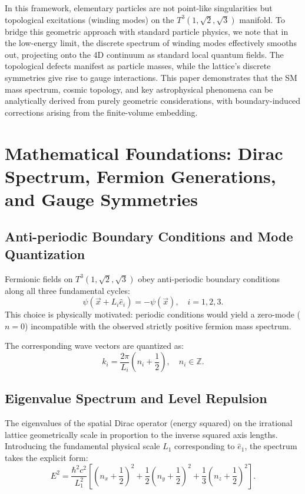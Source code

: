 \documentclass[onecolumn,aps,prd,superscriptaddress,nofootinbib,amsmath,amssymb]{revtex4-2}
\theoremstyle{definition}
\theoremstyle{remark}
\newcommand{\Tthree}{T^3(1,\sqrt{2},\sqrt{3})}
\begin{document}
In this framework, elementary particles are not point-like singularities but topological excitations (winding modes) on the $\Tthree$ manifold. To bridge this geometric approach with standard particle physics, we note that in the low-energy limit, the discrete spectrum of winding modes effectively smooths out, projecting onto the 4D continuum as standard local quantum fields. The topological defects manifest as particle masses, while the lattice's discrete symmetries give rise to gauge interactions. This paper demonstrates that the SM mass spectrum, cosmic topology, and key astrophysical phenomena can be analytically derived from purely geometric considerations, with boundary-induced corrections arising from the finite-volume embedding.

\section{Mathematical Foundations: Dirac Spectrum, Fermion Generations, and Gauge Symmetries}
\label{sec:dirac}

\subsection{Anti-periodic Boundary Conditions and Mode Quantization}

Fermionic fields on $\Tthree$ obey anti-periodic boundary conditions along all three fundamental cycles:
\begin{equation}
\psi(\vec{x} + L_i \hat{e}_i) = -\psi(\vec{x}), \quad i = 1,2,3.
\label{eq:antiperiodic}
\end{equation}
This choice is physically motivated: periodic conditions would yield a zero-mode ($n=0$) incompatible with the observed strictly positive fermion mass spectrum.

The corresponding wave vectors are quantized as:
\begin{equation}
k_i = \frac{2\pi}{L_i}\left(n_i + \frac{1}{2}\right), \quad n_i \in \mathbb{Z}.
\label{eq:wave_vectors}
\end{equation}

\subsection{Eigenvalue Spectrum and Level Repulsion}

The eigenvalues of the spatial Dirac operator (energy squared) on the irrational lattice geometrically scale in proportion to the inverse squared axis lengths. Introducing the fundamental physical scale $L_1$ corresponding to $\hat{e}_1$, the spectrum takes the explicit form:
\begin{equation}
E^2 = \frac{\hbar^2 c^2}{L_1^2} \left[ \left(n_x + \frac{1}{2}\right)^2 + \frac{1}{2}\left(n_y + \frac{1}{2}\right)^2 + \frac{1}{3}\left(n_z + \frac{1}{2}\right)^2 \right].
\label{eq:dirac_spectrum}
\end{equation}
\end{document}
